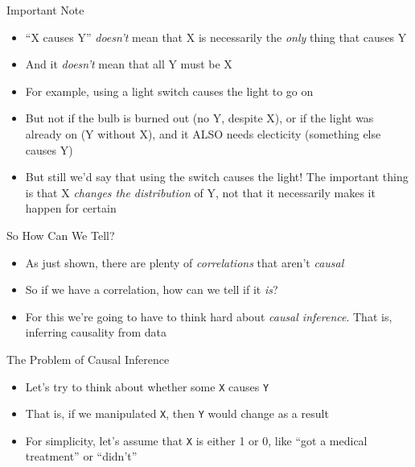 \documentclass[
  ignorenonframetext,
]{beamer}
\providecommand{\tightlist}{%
  \setlength{\itemsep}{0pt}\setlength{\parskip}{0pt}}
\begin{document}
\begin{frame}{Important Note}
\label{important-note}
\begin{itemize}
\tightlist
\item
  ``X causes Y'' \emph{doesn't} mean that X is necessarily the
  \emph{only} thing that causes Y
\item
  And it \emph{doesn't} mean that all Y must be X
\item
  For example, using a light switch causes the light to go on
\item
  But not if the bulb is burned out (no Y, despite X), or if the light
  was already on (Y without X), and it ALSO needs electicity (something
  else causes Y)
\item
  But still we'd say that using the switch causes the light! The
  important thing is that X \emph{changes the distribution} of Y, not
  that it necessarily makes it happen for certain
\end{itemize}
\end{frame}

\begin{frame}{So How Can We Tell?}
\label{so-how-can-we-tell}
\begin{itemize}
\tightlist
\item
  As just shown, there are plenty of \emph{correlations} that aren't
  \emph{causal}
\item
  So if we have a correlation, how can we tell if it \emph{is}?
\item
  For this we're going to have to think hard about \emph{causal
  inference}. That is, inferring causality from data
\end{itemize}
\end{frame}

\begin{frame}[fragile]{The Problem of Causal Inference}
\label{the-problem-of-causal-inference}
\begin{itemize}
\tightlist
\item
  Let's try to think about whether some \texttt{X} causes \texttt{Y}
\item
  That is, if we manipulated \texttt{X}, then \texttt{Y} would change as
  a result
\item
  For simplicity, let's assume that \texttt{X} is either 1 or 0, like
  ``got a medical treatment'' or ``didn't''
\end{itemize}
\end{frame}
\end{document}
